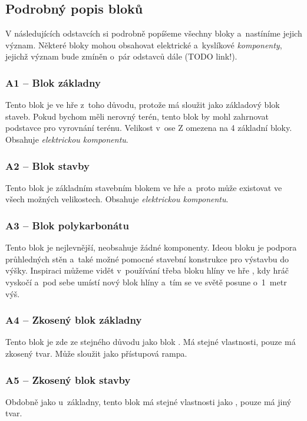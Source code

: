 \FloatBarrier


\subsection{Podrobný popis bloků}

V následujících odstavcích si podrobně popíšeme všechny bloky a~nastíníme jejich význam. Některé bloky mohou obsahovat elektrické a~kyslíkové \textit{komponenty}, jejichž význam bude zmíněn o~pár odstavců dále (TODO link!).



\subsubsection{A1 -- Blok základny}
\label{blocks:A1}
Tento blok je ve hře z~toho důvodu, protože má sloužit jako základový blok staveb. Pokud bychom měli nerovný terén, tento blok by mohl zahrnovat podstavce pro vyrovnání terénu. Velikost v~ose Z omezena na 4 základní bloky. Obsahuje \textit{elektrickou komponentu}.


\subsubsection{A2 -- Blok stavby}
\label{blocks:A2}
Tento blok je základním stavebním blokem ve hře a~proto může existovat ve všech možných velikostech. Obsahuje \textit{elektrickou komponentu}.


\subsubsection{A3 -- Blok polykarbonátu}
\label{blocks:A3}
Tento blok je nejlevnější, neobsahuje žádné komponenty. Ideou bloku je podpora průhledných stěn a~také možné pomocné stavební konstrukce pro výstavbu do výšky. Inspiraci můžeme vidět v~používání třeba bloku hlíny ve hře \MC{}, kdy hráč vyskočí a~pod sebe umístí nový blok hlíny a~tím se ve světě posune o~1~metr výš.


\subsubsection{A4 -- Zkosený blok základny}
\label{blocks:A4}
Tento blok je zde ze stejného důvodu jako blok . Má stejné vlastnosti, pouze má zkosený tvar. Může sloužit jako přístupová rampa.


\subsubsection{A5 -- Zkosený blok stavby}
\label{blocks:A5}
Obdobně jako u~základny, tento blok má stejné vlastnosti jako , pouze má jiný tvar.


